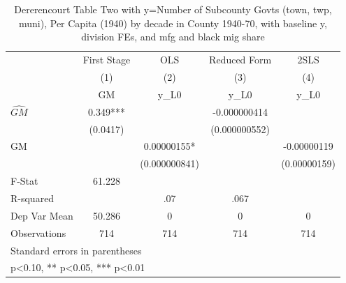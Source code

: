 \begin{table}[htbp]\centering
\def\sym#1{\ifmmode^{#1}\else\(^{#1}\)\fi}
\caption{Dererencourt Table Two with y=Number of Subcounty Govts (town, twp, muni), Per Capita (1940) by decade in County 1940-70, with baseline y, division FEs, and mfg and black mig share}
\begin{tabular}{l*{4}{c}}
\toprule
                    & First Stage   &         OLS   &Reduced Form   &        2SLS   \\
                    &\multicolumn{1}{c}{(1)}&\multicolumn{1}{c}{(2)}&\multicolumn{1}{c}{(3)}&\multicolumn{1}{c}{(4)}\\
                    &\multicolumn{1}{c}{GM}&\multicolumn{1}{c}{y\_L0}&\multicolumn{1}{c}{y\_L0}&\multicolumn{1}{c}{y\_L0}\\
\midrule
$\hat{GM}$          &       0.349***&               &-0.000000414   &               \\
                    &    (0.0417)   &               &(0.000000552)   &               \\
\addlinespace
GM                  &               &  0.00000155*  &               & -0.00000119   \\
                    &               &(0.000000841)   &               &(0.00000159)   \\
\midrule
F-Stat              &      61.228   &               &               &               \\
R-squared           &               &         .07   &        .067   &               \\
Dep Var Mean        &      50.286   &           0   &           0   &           0   \\
Observations        &         714   &         714   &         714   &         714   \\
\bottomrule
\multicolumn{5}{l}{\footnotesize Standard errors in parentheses}\\
\multicolumn{5}{l}{\footnotesize * p<0.10, ** p<0.05, *** p<0.01}\\
\end{tabular}
\end{table}
